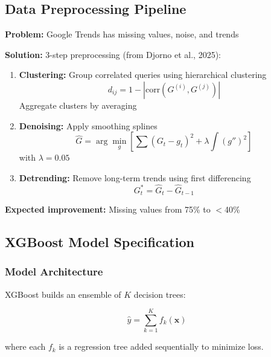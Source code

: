 \documentclass[12pt,a4paper]{article}
\begin{document}
\subsection{Data Preprocessing Pipeline}

\textbf{Problem:} Google Trends has missing values, noise, and trends

\textbf{Solution:} 3-step preprocessing (from Djorno et al., 2025):

\begin{enumerate}
    \item \textbf{Clustering:} Group correlated queries using hierarchical clustering
    \begin{equation}
    d_{ij} = 1 - |\text{corr}(G^{(i)}, G^{(j)})|
    \end{equation}
    Aggregate clusters by averaging
    
    \item \textbf{Denoising:} Apply smoothing splines
    \begin{equation}
    \hat{G} = \arg\min_g \left[ \sum (G_t - g_t)^2 + \lambda \int (g'')^2 \right]
    \end{equation}
    with $\lambda = 0.05$
    
    \item \textbf{Detrending:} Remove long-term trends using first differencing
    \begin{equation}
    G_t^* = \hat{G}_t - \hat{G}_{t-1}
    \end{equation}
\end{enumerate}

\textbf{Expected improvement:} Missing values from 75\% to $<$40\%

\subsection{XGBoost Model Specification}

\subsubsection{Model Architecture}

XGBoost builds an ensemble of $K$ decision trees:

\begin{equation}
\hat{y} = \sum_{k=1}^{K} f_k(\mathbf{x})
\end{equation}

where each $f_k$ is a regression tree added sequentially to minimize loss.
\end{document}
